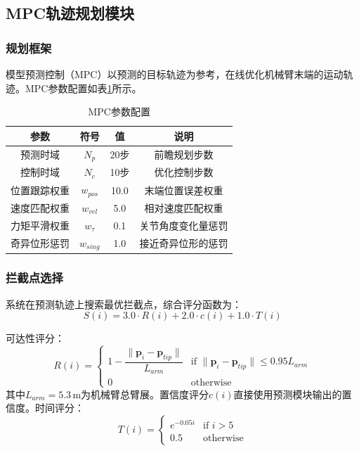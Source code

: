 \documentclass[12pt,a4paper]{ctexart}
\begin{document}
\subsection{MPC轨迹规划模块}

\subsubsection{规划框架}

模型预测控制（MPC）以预测的目标轨迹为参考，在线优化机械臂末端的运动轨迹\cite{camacho2007}。MPC参数配置如表\ref{tab:mpc}所示。

\begin{table}[H]
\centering
\caption{MPC参数配置}
\label{tab:mpc}
\begin{tabular}{cccc}
\toprule
参数 & 符号 & 值 & 说明 \\
\midrule
预测时域     & $N_p$       & 20步  & 前瞻规划步数 \\
控制时域     & $N_c$       & 10步  & 优化控制步数 \\
位置跟踪权重 & $w_{pos}$   & 10.0  & 末端位置误差权重 \\
速度匹配权重 & $w_{vel}$   & 5.0   & 相对速度匹配权重 \\
力矩平滑权重 & $w_{\tau}$  & 0.1   & 关节角度变化量惩罚 \\
奇异位形惩罚 & $w_{sing}$  & 1.0   & 接近奇异位形的惩罚 \\
\bottomrule
\end{tabular}
\end{table}

\subsubsection{拦截点选择}

系统在预测轨迹上搜索最优拦截点，综合评分函数为：
\begin{equation}
  S(i) = 3.0 \cdot R(i) + 2.0 \cdot c(i) + 1.0 \cdot T(i)
\end{equation}

可达性评分：
\begin{equation}
  R(i) = \begin{cases} 1 - \dfrac{\|\mathbf{p}_i - \mathbf{p}_{tip}\|}{L_{arm}} & \text{if } \|\mathbf{p}_i - \mathbf{p}_{tip}\| \leq 0.95 L_{arm} \\[6pt] 0 & \text{otherwise} \end{cases}
\end{equation}
其中$L_{arm} = 5.3$\,m为机械臂总臂展。置信度评分$c(i)$直接使用预测模块输出的置信度。时间评分：
\begin{equation}
  T(i) = \begin{cases} e^{-0.05i} & \text{if } i > 5 \\ 0.5 & \text{otherwise} \end{cases}
\end{equation}
\end{document}
